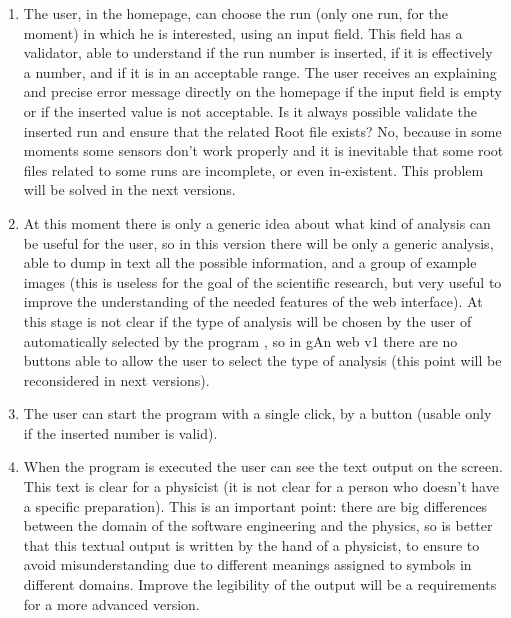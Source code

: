\begin{enumerate}

\item The user, in the homepage, can choose the run (only one run, for the moment) in which he is interested, using an input field. This field has a validator, able to understand if the run number is inserted, if it is effectively a number, and if it is in an acceptable range. The user receives an explaining and precise error message directly on the homepage if the input field is empty or if the inserted value is not acceptable. Is it always possible validate the inserted run and ensure that the related Root file exists? No, because in some moments some sensors don't work properly and it is inevitable that some root files related to some runs are incomplete, or even in-existent. This problem will be solved in the next versions.

\item At this moment there is only a generic idea about what kind of analysis can be useful for the user, so in this version there will be only a generic analysis, able to dump in text all the possible information, and a group of example images (this is useless for the goal of the scientific research, but very useful to improve the understanding of the needed features of the web interface).
At this stage is not clear if the type of analysis will be chosen by the user of automatically selected by the program , so in gAn web v1 there are no buttons able to allow the user to select the type of analysis (this point will be reconsidered in next versions).

\item The user can start the program with a single click, by a button (usable only if the inserted number is valid).

\item When the program is executed the user can see the text output on the screen. This text is clear for a physicist (it is not clear for a person who doesn't have a specific preparation). This is an important point: there are big differences between the domain of the software engineering and the physics, so is better that this textual output is written by the hand of a physicist, to ensure to avoid misunderstanding due to different meanings assigned to symbols in different domains. Improve the legibility of the output will be a requirements for a more advanced version. 


\end{enumerate}
